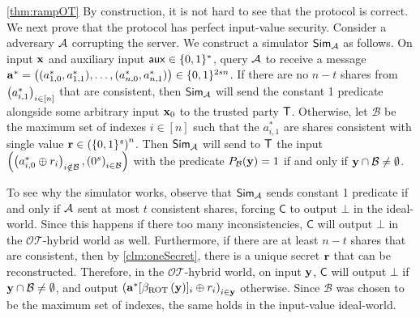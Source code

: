 \documentclass{llncs}
\newcommand{\OTfunc}{\mathcal{OT}}
\newcommand{\OThybrid}{\OTfunc\mbox{-}\text{hybrid}}
\newcommand{\ROT}{\operatorname{ROT}}
\renewcommand{\B}{\mathcal{B}}
\renewcommand{\a}{\myvec{a}}
\newcommand{\x}{\myvec{x}}
\newcommand{\y}{\myvec{y}}
\newcommand{\aux}{\mathsf{aux}}
\newcommand{\clnt}{\beta}
\newcommand{\Cc}{\mathsf{C}}
\begin{document}
\begin{proofof}{\cref{thm:rampOT}}
By construction, it is not hard to see that the protocol is correct. We next prove that the protocol has perfect input-value security. Consider a adversary $\mathcal{A}$ corrupting the server. We construct a simulator $\mathsf{Sim}_{\mathcal{A}}$ as follows. On input $\x$ and auxiliary input $\aux\in\zo^*$, query $\mathcal{A}$ to receive a message $\a^*=\vect{(a^*_{1,0},a^*_{1,1}),\ldots,(a^*_{n,0},a^*_{n,1})}\in\zo^{2sn}$. If there are no $n-t$ shares from $\left ( a^*_{i,1} \right )_{i\in[n]}$ that are consistent, then $\mathsf{Sim}_{\mathcal{A}}$ will send the constant 1 predicate alongside some arbitrary input $\x_0$ to the trusted party $\mathsf{T}$. Otherwise, let $\B$ be the maximum set of indexes $i\in[n]$ such that the $a^*_{i,1}$ are shares consistent with single value ${\bf r}\in\left(\{0,1\}^s\right)^n$. Then $\mathsf{Sim}_{\mathcal{A}}$ will send to $\mathsf{T}$ the input $\left(\vect{a^*_{i,0}\xor r_i}_{i\notin\B},\vect{0^s}_{i\in\B}\right)$ with the predicate $P_\B(\y)=1$ if and only if $\y\cap\B\ne\emptyset$.

To see why the simulator works, observe that $\mathsf{Sim}_{\mathcal{A}}$ sends constant 1 predicate if and only if $\mathcal{A}$ sent at most $t$ consistent shares, forcing $\Cc$ to output $\bot$ in the ideal-world. Since this happens if there too many inconsistencies, $\Cc$ will output $\bot$ in the $\OThybrid$ world as well. Furthermore, if there are at least $n-t$ shares that are consistent, then by \cref{clm:oneSecret}, there is a unique secret ${\bf r}$ that can be reconstructed. Therefore, in the $\OThybrid$ world, on input $\y$, $\Cc$ will output $\bot$ if $\y\cap\B\ne\emptyset$, and output $\vect{\a^*[\clnt_{\ROT}\of{\y}]_i\xor r_i}_{i\in\y}$ otherwise. Since $\B$ was chosen to be the maximum set of indexes, the same holds in the input-value ideal-world.




\end{proofof}
\end{document}
